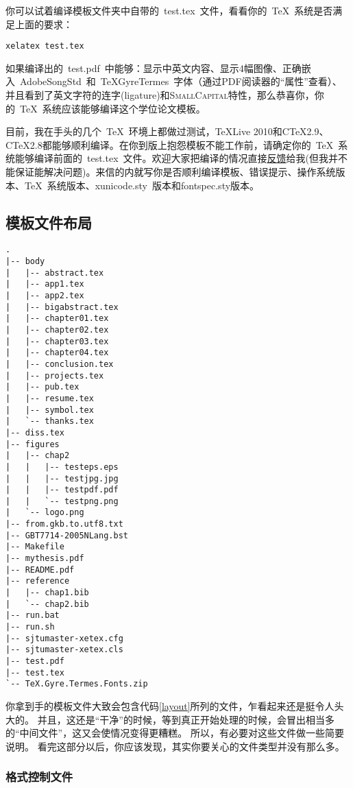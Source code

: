你可以试着编译模板文件夹中自带的~test.tex~文件，看看你的~\TeX~系统是否满足上面的要求：

\begin{verbatim}
xelatex test.tex
\end{verbatim}

如果编译出的~test.pdf~中能够：显示中英文内容、显示4幅图像、正确嵌入~AdobeSongStd~和~TeXGyreTermes~字体（通过PDF阅读器的“属性”查看）、并且看到了英文字符的连字(ligature)和\textsc{SmallCapital}特性，那么恭喜你，你的~\TeX~系统应该能够编译这个学位论文模板。

目前，我在手头的几个~\TeX~环境上都做过测试，TeXLive 2010和C\TeX 2.9、C\TeX 2.8都能够顺利编译。在你到版上抱怨模板不能工作前，请确定你的~\TeX~系统能够编译前面的~test.tex~文件。欢迎大家把编译的情况直接\href{mailto:wei.jianwen@gmail.com}{反馈}给我(但我并不能保证能解决问题)。来信的内就写你是否顺利编译模板、错误提示、操作系统版本、\TeX~系统版本、xunicode.sty~版本和fontspec.sty版本。
 
\subsection{模板文件布局}
\label{sec:layout}

\begin{lstlisting}[basicstyle=\small\ttfamily,caption={模板文件布局},label=layout,float,numbers=none]
.
|-- body
|   |-- abstract.tex
|   |-- app1.tex
|   |-- app2.tex
|   |-- bigabstract.tex
|   |-- chapter01.tex
|   |-- chapter02.tex
|   |-- chapter03.tex
|   |-- chapter04.tex
|   |-- conclusion.tex
|   |-- projects.tex
|   |-- pub.tex
|   |-- resume.tex
|   |-- symbol.tex
|   `-- thanks.tex
|-- diss.tex
|-- figures
|   |-- chap2
|   |   |-- testeps.eps
|   |   |-- testjpg.jpg
|   |   |-- testpdf.pdf
|   |   `-- testpng.png
|   `-- logo.png
|-- from.gkb.to.utf8.txt
|-- GBT7714-2005NLang.bst
|-- Makefile
|-- mythesis.pdf
|-- README.pdf
|-- reference
|   |-- chap1.bib
|   `-- chap2.bib
|-- run.bat
|-- run.sh
|-- sjtumaster-xetex.cfg
|-- sjtumaster-xetex.cls
|-- test.pdf
|-- test.tex
`-- TeX.Gyre.Termes.Fonts.zip
\end{lstlisting}

你拿到手的模板文件大致会包含代码\ref{layout}所列的文件，乍看起来还是挺令人头大的。
并且，这还是“干净”的时候，等到真正开始处理的时候，会冒出相当多的“中间文件”，这又会使情况变得更糟糕。
所以，有必要对这些文件做一些简要说明。
看完这部分以后，你应该发现，其实你要关心的文件类型并没有那么多。

\subsubsection{格式控制文件}
\label{sec:format}

